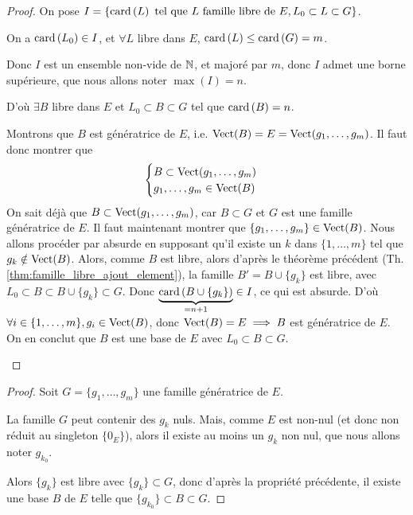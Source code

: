 \documentclass[12pt,a4paper]{report}
\begin{document}
\begin{proof}
    On pose $I = \{\mathrm{card}\left(L\right) \text{ tel que } L \text{ famille libre de } E, L_0 \subset L \subset G\}$.

    \begin{outline}
        \1 On a $\mathrm{card}\left(L_0\right) \in I$, et $\forall L$ libre dans $E$, $\mathrm{card}\left(L\right) \le \mathrm{card}\left(G\right) = m$.

        \1 Donc $I$ est un ensemble non-vide de $\mathbb{N}$, et majoré par $m$, donc $I$ admet une borne supérieure, que nous allons noter $\max(I) = n$.

        \1 D'où $\exists B$ libre dans $E$ et $L_0 \subset B \subset G$ tel que $\mathrm{card}\left(B\right) = n$.

        \1 Montrons que $B$ est génératrice de $E$, i.e. $\mathrm{Vect}(B) = E = \mathrm{Vect}(g_1,\dots,g_m)$.
            \2 Il faut donc montrer que
            $$\begin{cases}
            B \subset \mathrm{Vect}(g_1,\dots,g_m)\\
            g_1,\dots,g_m \in \mathrm{Vect}(B)
            \end{cases}$$
            \2 On sait déjà que $B \subset \mathrm{Vect}(g_1,\dots,g_m)$, car $B \subset G$ et $G$ est une famille génératrice de $E$.
            \2 Il faut maintenant montrer que $\{g_1,\dots,g_m\} \in \mathrm{Vect}(B)$.
            \3 Nous allons procéder par absurde en supposant qu'il existe un $k$ dans $\{1,\dots,m\}$ tel que $g_k \notin \mathrm{Vect}(B)$.
            \3 Alors, comme $B$ est libre, alors d'après le théorème précédent (Th. \ref{thm:famille_libre_ajout_element}), la famille $B' = B\cup \{g_k\}$ est libre, avec $L_0 \subset B \subset B\cup\{g_k\} \subset G$.
            \3 Donc $\underbrace{\mathrm{card}\left(B\cup\{g_k\}\right)}_{=n+1} \in I$, ce qui est absurde.
        \2 D'où $\forall i \in \{1,\dots,m\}, g_i \in \mathrm{Vect}(B)$, donc $\mathrm{Vect}(B) = E \implies B$ est génératrice de $E$.
        \2 On en conclut que $B$ est une base de $E$ avec $L_0 \subset B \subset G$.
    \end{outline}
\end{proof}

\begin{proof}
    Soit $G = \{g_1,\dots,g_m\}$ une famille génératrice de $E$.

    La famille $G$ peut contenir des $g_k$ nuls. Mais, comme $E$ est non-nul (et donc non réduit au singleton $\{0_E\}$), alors il existe au moins un $g_k$ non nul, que nous allons noter $g_{k_0}$.

    Alors $\{g_k\}$ est libre avec $\{g_k\} \subset G$, donc d'après la propriété précédente, il existe une base $B$ de $E$ telle que $\{g_{k_0}\} \subset B \subset G$.
\end{proof}
\end{document}
